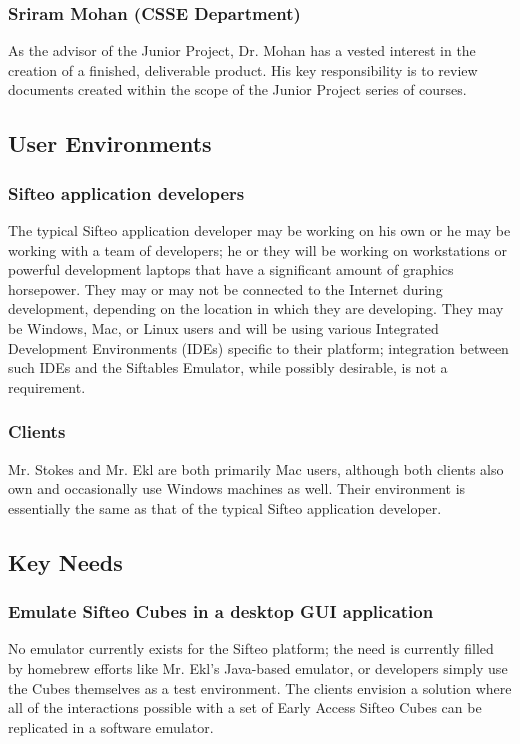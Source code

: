 \documentclass[12pt]{article}
\begin{document}
                          \subsubsection{Sriram Mohan (CSSE Department)}
                          As the advisor of the Junior Project, Dr. Mohan has a vested interest in the creation of a finished, deliverable product. His key responsibility is to review documents created within the scope of the Junior Project series of courses.

               \subsection{User Environments}

                          \subsubsection{Sifteo application developers}
						  The typical Sifteo application developer may be working on his own or he may be working with a team of developers; he or they will be working on workstations or powerful development laptops that have a significant amount of graphics horsepower. They may or may not be connected to the Internet during development, depending on the location in which they are developing. They may be Windows, Mac, or Linux users and will be using various Integrated Development Environments (IDEs) specific to their platform; integration between such IDEs and the Siftables Emulator, while possibly desirable, is not a requirement.

                          \subsubsection{Clients}
						  Mr. Stokes and Mr. Ekl are both primarily Mac users, although both clients also own and occasionally use Windows machines as well. Their environment is essentially the same as that of the typical Sifteo application developer.

               \subsection{Key Needs}

                          \subsubsection{Emulate Sifteo Cubes in a desktop GUI application}
                          No emulator currently exists for the Sifteo platform; the need is currently filled by homebrew efforts like Mr. Ekl’s Java-based emulator, or developers simply use the Cubes themselves as a test environment. The clients envision a solution where all of the interactions possible with a set of Early Access Sifteo Cubes can be replicated in a software emulator.
\end{document}
